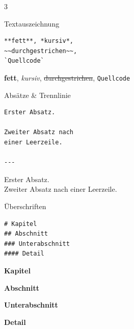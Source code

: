 \documentclass[a4paper,landscape,9pt]{extarticle}
\newcommand{\prevtxt}[1]{{\small #1}}
\begin{document}
\begin{multicols}{3}


\begin{mdcard}{Textauszeichnung}
\begin{lstlisting}[language=lia]
**fett**, *kursiv*,
~~durchgestrichen~~,
`Quellcode`
\end{lstlisting}
\tcblower
\prevtxt{\textbf{fett}, \textit{kursiv},
\sout{durchgestrichen}, \texttt{Quellcode}}
\end{mdcard}

\begin{mdcard}{Absätze \& Trennlinie}
\begin{lstlisting}[language=lia]
Erster Absatz.

Zweiter Absatz nach
einer Leerzeile.

---
\end{lstlisting}
\tcblower
\prevtxt{Erster Absatz.\\[3pt]
Zweiter Absatz nach einer Leerzeile.\\[2pt]
\textcolor{rulegray}{\hrulefill}}
\end{mdcard}

\begin{mdcard}{Überschriften}
\begin{lstlisting}[language=lia]
# Kapitel
## Abschnitt
### Unterabschnitt
#### Detail
\end{lstlisting}
\tcblower
{\large\bfseries Kapitel}\par\vspace{1pt}
{\normalsize\bfseries Abschnitt}\par\vspace{1pt}
{\small\bfseries Unterabschnitt}\par\vspace{1pt}
{\footnotesize\bfseries Detail}
\end{mdcard}


\end{multicols}
\end{document}
